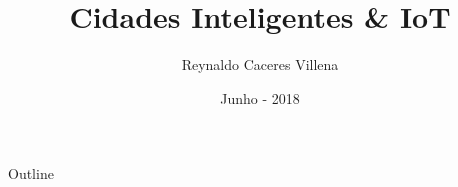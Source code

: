 \documentclass{beamer}
\title[]{Cidades Inteligentes \& IoT}
\author{Reynaldo Caceres Villena}
\institute{IME-USP}
\date{Junho - 2018}
\begin{document}
\begin{frame}
  \titlepage
\end{frame}

\begin{frame}{Outline}
  \tableofcontents
\end{frame}
\end{document}

